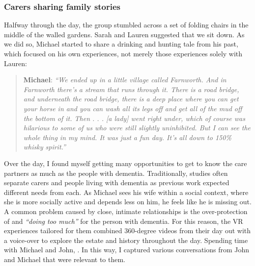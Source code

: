 \subsubsection{Carers sharing family stories}
Halfway through the day, the group stumbled across a set of folding chairs in the middle of the walled gardens. Sarah and Lauren suggested that we sit down. As we did so, Michael started to share a drinking and hunting tale from his past, which focused on his own experiences, not merely those experiences solely with Lauren:

\begin{quote}
\textbf{Michael}:\textit{    ``We ended up in a little village called Farnworth. And in Farnworth there's a stream that runs through it. There is a road bridge, and underneath the road bridge, there is a deep place where you can get your horse in and you can wash all its legs off and get all of the mud off the bottom of it. Then . . . [a lady] went right under, which of course was hilarious to some of us who were still slightly uninhibited. But I can see the whole thing in my mind. It was just a fun day. It's all down to 150\% whisky spirit.''
}\end{quote}

Over the day, I found myself getting many opportunities to get to know the care partners as much as the people with dementia. Traditionally, studies often separate carers and people living with dementia as previous work expected different needs from each. As Michael sees his wife within a social context, where she is more socially active and depends less on him, he feels like he is missing out. A common problem caused by close, intimate relationships is the over-protection of and \textit{``doing too much''} for the person with dementia. For this reason, the VR experiences tailored for them combined 360-degree videos from their day out with a voice-over to explore the estate and history throughout the day. Spending time with Michael and John, . In this way, I captured various conversations from John and Michael that were relevant to them. 

